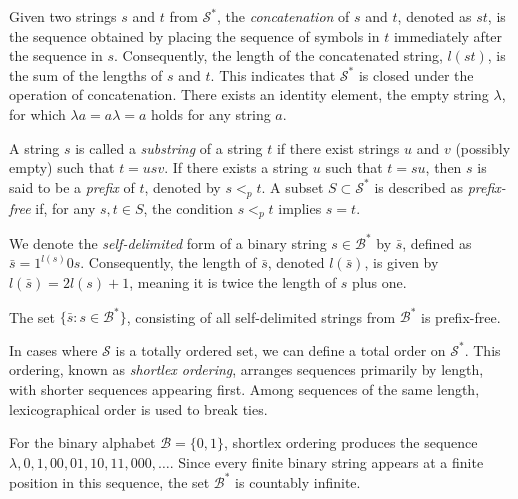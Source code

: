 Given two strings $s$ and $t$ from $\mathcal{S}^{\ast}$, the \emph{concatenation} of $s$ and $t$, denoted as $st$, is the sequence obtained by placing the sequence of symbols in $t$ immediately after the sequence in $s$. Consequently, the length of the concatenated string, $l(st)$, is the sum of the lengths of $s$ and $t$. This indicates that $\mathcal{S}^\ast$ is closed under the operation of concatenation. There exists an identity element, the empty string $\lambda$, for which $\lambda a = a \lambda = a$ holds for any string $a$.

A string $s$ is called a \emph{substring} of a string $t$ if there exist strings $u$ and $v$ (possibly empty) such that $t = usv$. If there exists a string $u$ such that $t = su$, then $s$ is said to be a \emph{prefix} of $t$, denoted by $s <_p t$. A subset $S \subset \mathcal{S}^{\ast}$ is described as \emph{prefix-free} if, for any $s, t \in S$, the condition $s <_p t$ implies $s = t$.

We denote the \emph{self-delimited}  form of a binary string $s \in \mathcal{B}^{\ast}$ by $\bar{s}$, defined as $\bar{s} = 1^{l(s)}0s$. Consequently, the length of $\bar{s}$, denoted $l(\bar{s})$, is given by $l(\bar{s}) = 2l(s) + 1$, meaning it is twice the length of $s$ plus one.

\begin{example}
The set $\{\bar{s} : s \in \mathcal{B}^{\ast}\}$, consisting of all self-delimited strings from $\mathcal{B}^{\ast}$ is prefix-free.
\end{example}

In cases where $\mathcal{S}$ is a totally ordered set, we can define a total order on $\mathcal{S}^{\ast}$. This ordering, known as \emph{shortlex ordering}, arranges sequences primarily by length, with shorter sequences appearing first. Among sequences of the same length, lexicographical order is used to break ties.

\begin{example}
For the binary alphabet $\mathcal{B} = \{0,1\}$, shortlex ordering produces the sequence $\lambda, 0, 1, 00, 01, 10, 11, 000, \ldots$. Since every finite binary string appears at a finite position in this sequence, the set $\mathcal{B}^*$ is countably infinite.
\end{example}

